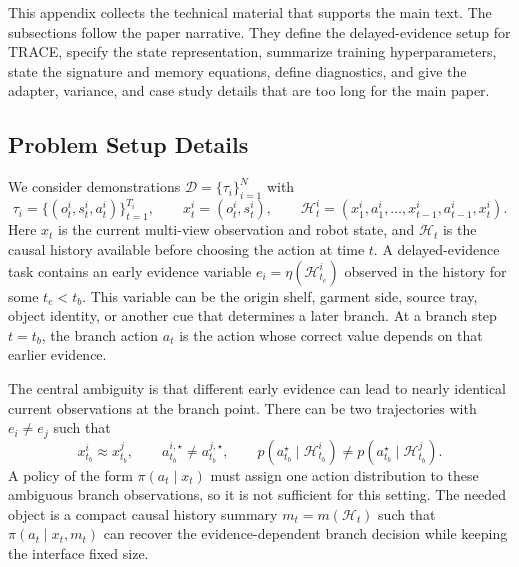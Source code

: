 \documentclass{article}
\begin{document}
This appendix collects the technical material that supports the main text. The subsections follow the paper narrative. They define the delayed-evidence setup for TRACE, specify the state representation, summarize training hyperparameters, state the signature and memory equations, define diagnostics, and give the adapter, variance, and case study details that are too long for the main paper.

\subsection{Problem Setup Details}
\label{app:problem_setup_details}

We consider demonstrations $\mathcal{D}=\{\tau_i\}_{i=1}^{N}$ with
\begin{equation}
    \tau_i=\{(o_t^i,s_t^i,a_t^i)\}_{t=1}^{T_i},
    \qquad
    x_t^i=(o_t^i,s_t^i),
    \qquad
    \mathcal{H}_t^i=(x_1^i,a_1^i,\ldots,x_{t-1}^i,a_{t-1}^i,x_t^i).
    \label{eq:app_demonstrations}
\end{equation}
Here $x_t$ is the current multi-view observation and robot state, and $\mathcal{H}_t$ is the causal history available before choosing the action at time $t$. A delayed-evidence task contains an early evidence variable $e_i=\eta(\mathcal{H}_{t_e}^i)$ observed in the history for some $t_e<t_b$. This variable can be the origin shelf, garment side, source tray, object identity, or another cue that determines a later branch. At a branch step $t=t_b$, the branch action $a_t$ is the action whose correct value depends on that earlier evidence.

The central ambiguity is that different early evidence can lead to nearly identical current observations at the branch point. There can be two trajectories with $e_i\neq e_j$ such that
\begin{equation}
    x_{t_b}^i\approx x_{t_b}^j,
    \qquad
    a_{t_b}^{i,\star}
    \neq
    a_{t_b}^{j,\star},
    \qquad
    p(a_{t_b}^{\star}\mid \mathcal{H}_{t_b}^i)
    \neq
    p(a_{t_b}^{\star}\mid \mathcal{H}_{t_b}^j).
    \label{eq:app_delayed_evidence}
\end{equation}
A policy of the form $\pi(a_t\mid x_t)$ must assign one action distribution to these ambiguous branch observations, so it is not sufficient for this setting. The needed object is a compact causal history summary $m_t=m(\mathcal{H}_t)$ such that $\pi(a_t\mid x_t,m_t)$ can recover the evidence-dependent branch decision while keeping the interface fixed size.
\end{document}
